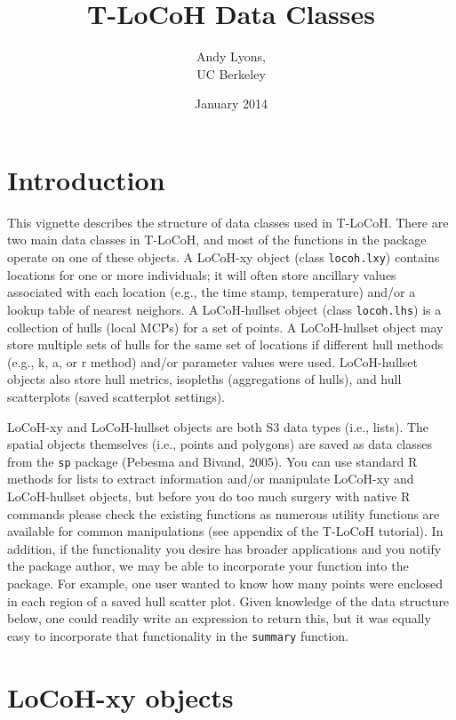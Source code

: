 \documentclass{article}
\title{ T-LoCoH Data Classes }
\author{Andy Lyons,\\
  UC Berkeley}
\date{January 2014}
\begin{document}

\maketitle

\section*{Introduction}

This vignette describes the structure of data classes used in T-LoCoH. There are two main data classes in T-LoCoH, and most of the functions in the package operate on one of these objects. A LoCoH-xy object (class \texttt{locoh.lxy}) contains locations for one or more individuals; it will often store ancillary values associated with each location (e.g., the time stamp, temperature) and/or a lookup table of nearest neighors. A LoCoH-hullset object (class \texttt{locoh.lhs}) is a collection of hulls (local MCPs) for a set of points. A LoCoH-hullset object may store multiple sets of hulls for the same set of locations if different hull methods (e.g., k, a, or r method) and/or parameter values were used. LoCoH-hullset objects also store hull metrics, isopleths (aggregations of hulls), and hull scatterplots (saved scatterplot settings).

LoCoH-xy and LoCoH-hullset objects are both S3 data types (i.e., lists). The spatial objects themselves (i.e., points and polygons) are saved as data classes from the \texttt{sp} package (Pebesma and Bivand, 2005). You can use standard R methods for lists to extract information and/or manipulate LoCoH-xy and LoCoH-hullset objects, but before you do too much surgery with native R commands please check the existing functions as numerous utility functions are available for common manipulations (see appendix of the T-LoCoH tutorial). In addition, if the functionality you desire has broader applications and you notify the package author, we may be able to incorporate your function into the package. For example, one user wanted to know how many points were enclosed in each region of a saved hull scatter plot. Given knowledge of the data structure below, one could readily write an expression to return this, but it was equally easy to incorporate that functionality in the \texttt{summary} function.

\section*{LoCoH-xy objects}
\end{document}
